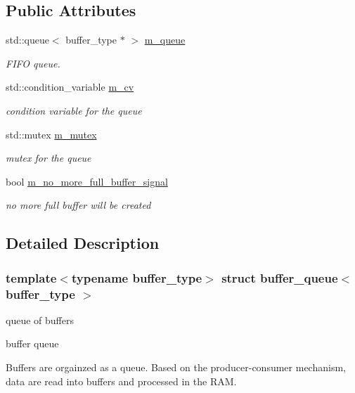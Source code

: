\subsection*{Public Attributes}
\begin{DoxyCompactItemize}
\item 
std\+::queue$<$ buffer\+\_\+type $\ast$ $>$ \hyperlink{structbuffer__queue_abac5a752d815ded66d3ab87b5b6649b6}{m\+\_\+queue}
\begin{DoxyCompactList}\small\item\em F\+I\+FO queue. \end{DoxyCompactList}\item 
std\+::condition\+\_\+variable \hyperlink{structbuffer__queue_a65f560d9b82c5154044243c21867a773}{m\+\_\+cv}
\begin{DoxyCompactList}\small\item\em condition variable for the queue \end{DoxyCompactList}\item 
std\+::mutex \hyperlink{structbuffer__queue_aa554ca5c5cccd9b58ddad9d25fa7f7e8}{m\+\_\+mutex}
\begin{DoxyCompactList}\small\item\em mutex for the queue \end{DoxyCompactList}\item 
bool \hyperlink{structbuffer__queue_abcecda21a70871516c9322a4b4f3c6bd}{m\+\_\+no\+\_\+more\+\_\+full\+\_\+buffer\+\_\+signal}
\begin{DoxyCompactList}\small\item\em no more full buffer will be created \end{DoxyCompactList}\end{DoxyCompactItemize}


\subsection{Detailed Description}
\subsubsection*{template$<$typename buffer\+\_\+type$>$\newline
struct buffer\+\_\+queue$<$ buffer\+\_\+type $>$}

queue of buffers 

buffer queue

Buffers are orgainzed as a queue. Based on the producer-\/consumer mechanism, data are read into buffers and processed in the R\+AM. 

